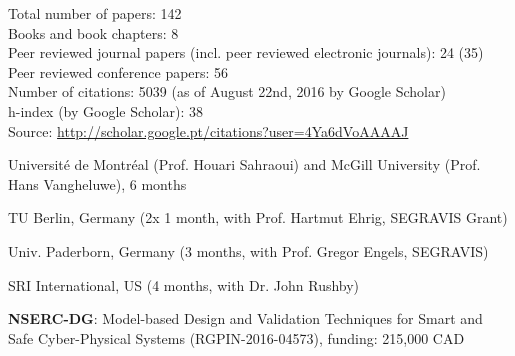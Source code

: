 \documentclass{xetexCV}
\begin{document}
Total number of papers: 142 \\
Books and book chapters: 8 \\
Peer reviewed journal papers (incl. peer reviewed electronic journals): 24  (35) \\
Peer reviewed conference papers: 56  \\
Number of citations: 5039 (as of August 22nd, 2016 by Google Scholar) \\
h-index (by Google Scholar): 38 \\
Source: \url{http://scholar.google.pt/citations?user=4Ya6dVoAAAAJ} 

Universit\'e de Montr\'eal  (Prof. Houari Sahraoui) and McGill University (Prof. Hans Vangheluwe),  6 months


TU Berlin, Germany (2x 1 month, with Prof. Hartmut Ehrig, SEGRAVIS Grant)

Univ. Paderborn, Germany  (3 months, with Prof. Gregor Engels,
SEGRAVIS) \

SRI International, US (4 months, with Dr. John Rushby)  



\textbf{NSERC-DG}:  Model-based Design and Validation Techniques for
Smart and Safe Cyber-Physical Systems (RGPIN-2016-04573), funding: 215,000 CAD \\
\end{document}
